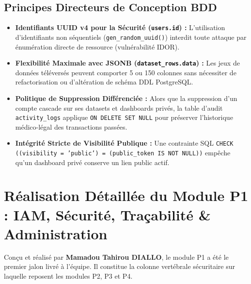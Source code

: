 \documentclass[11pt,a4paper]{article}
\begin{document}
\subsection{Principes Directeurs de Conception BDD}
\begin{itemize}[leftmargin=1.5cm, label=\textcolor{brandblue}{\textbullet}]
    \item \textbf{Identifiants UUID v4 pour la Sécurité (\texttt{users.id}) :} L'utilisation d'identifiants non séquentiels (\texttt{gen\_random\_uuid()}) interdit toute attaque par énumération directe de ressource (vulnérabilité IDOR).
    \item \textbf{Flexibilité Maximale avec JSONB (\texttt{dataset\_rows.data}) :} Les jeux de données téléversés peuvent comporter 5 ou 150 colonnes sans nécessiter de refactorisation ou d'altération de schéma DDL PostgreSQL.
    \item \textbf{Politique de Suppression Différenciée :} Alors que la suppression d'un compte cascade sur ses datasets et dashboards privés, la table d'audit \texttt{activity\_logs} applique \texttt{ON DELETE SET NULL} pour préserver l'historique médico-légal des transactions passées.
    \item \textbf{Intégrité Stricte de Visibilité Publique :} Une contrainte SQL \texttt{CHECK ((visibility = 'public') = (public\_token IS NOT NULL))} empêche qu'un dashboard privé conserve un lien public actif.
\end{itemize}

\section{Réalisation Détaillée du Module P1 : IAM, Sécurité, Traçabilité \& Administration}

Conçu et réalisé par \textbf{Mamadou Tahirou DIALLO}, le module P1 a été le premier jalon livré à l'équipe. Il constitue la colonne vertébrale sécuritaire sur laquelle reposent les modules P2, P3 et P4.
\end{document}
